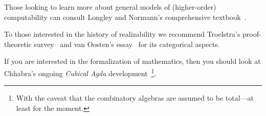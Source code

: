 Those looking to learn more about general models of (higher-order) computability
can consult Longley and Normann's comprehensive
textbook~\cite{LongleyNormann2015}.

To those interested in the history of realizability we recommend Troelstra's
proof-theoretic survey~\cite{Troelstra1998} and van Oosten's
essay~\cite{vanOosten2002} for its categorical aspects.

If you are interested in the formalization of mathematics, then you should look
at Chhabra's ongoing \emph{Cubical Agda} development~\cite{Chhabra2023}\footnote{With
  the caveat that the combinatory algebras are assumed to be total---at least for
  the moment.}.


